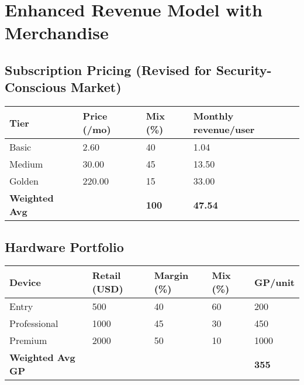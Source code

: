 \documentclass[11pt]{article}
\begin{document}
\section{Enhanced Revenue Model with Merchandise}

\subsection{Subscription Pricing (Revised for Security-Conscious Market)}
\begin{table}[H]
\centering
\begin{tabularx}{\linewidth}{l Y Y Y}
\toprule
Tier & Price (/mo) & Mix (\%) & Monthly revenue/user \\\midrule
Basic   & 2.60  & 40 & 1.04 \\
Medium  & 30.00 & 45 & 13.50 \\
Golden  & 220.00& 15 & 33.00 \\\midrule
\textbf{Weighted Avg} &  & \textbf{100} & \textbf{47.54} \\
\bottomrule
\end{tabularx}
\end{table}

\subsection{Hardware Portfolio}
\begin{table}[H]
\centering
\begin{tabularx}{\linewidth}{l Y Y Y Y}
\toprule
Device & Retail (USD) & Margin (\%) & Mix (\%) & GP/unit \\\midrule
Entry        & 500  & 40 & 60 & 200 \\
Professional & 1000 & 45 & 30 & 450 \\
Premium      & 2000 & 50 & 10 & 1000 \\\midrule
\textbf{Weighted Avg GP} &  &  &  & \textbf{355} \\
\bottomrule
\end{tabularx}
\end{table}
\end{document}
